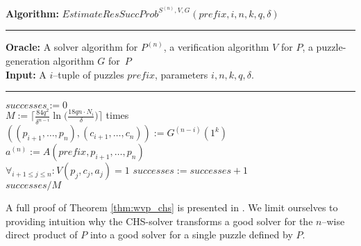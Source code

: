 %
\begin{codeblock}
  \textbf{Algorithm:} $\mathit{EstimateResSuccProb}^{S^{(n)},V, G}(\mathit{prefix}, i, n, k, q, \delta)$
  \medskip \hrule
  \textbf{Oracle:} A solver algorithm for $P^{(n)}$, a verification algorithm $V$ for $P$, a puzzle-generation algorithm $G$ for~$P$\\
  \textbf{Input:} A $i$--tuple of puzzles $\mathit{prefix}$, parameters $i, n, k, q, \delta$.
  \medskip\hrule
  $successes := 0$ \\
  \Repeat $M := \Big\lceil \frac{84q^2}{\delta^{n-i}} \ln \Big(\frac{18qn \cdot N_i}{\delta} \Big) \Big\rceil$ times \\
  \IndI $((p_{i+1}, \dotsc, p_n), (c_{i+1}, \dotsc, c_n)) := G^{(n-i)}(1^k)$\\
  \IndI $a^{(n)} := A(\mathit{prefix}, p_{i+1}, \dotsc, p_{n})$\\
  \IndI \If $\forall_{i + 1\leq j \leq n} : V(p_j, c_j, a_j) = 1$ \Then $\mathit{successes := successes + 1}$ \\
  \Return $successes / M$
\end{codeblock}
%
A full proof of Theorem \ref{thm:wvp_chs} is presented in \cite{canetti2005hardness}.
We limit ourselves to providing intuition why the CHS-solver transforms a good solver
for the $n$--wise direct product of $P$ into a good solver for a single puzzle defined by $P$.

